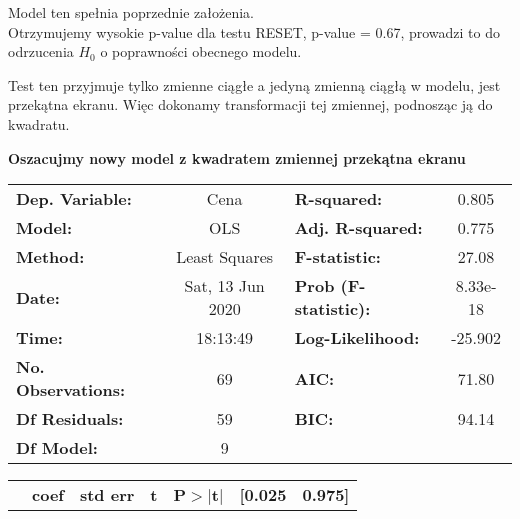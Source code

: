 \documentclass[11pt,a4paper]{article}
\begin{document}
		Model ten spełnia poprzednie założenia. \\
		
		Otrzymujemy wysokie p-value dla testu RESET, p-value = 0.67, prowadzi to do odrzucenia $H_0$ o poprawności obecnego modelu.
		
		Test ten przyjmuje tylko zmienne ciągłe a jedyną zmienną ciągłą w modelu, jest przekątna ekranu. 
		Więc dokonamy transformacji tej zmiennej, podnosząc ją do kwadratu.
		
		
			\textbf{Oszacujmy nowy model z kwadratem zmiennej przekątna ekranu }
			
			\begin{center}
				\begin{tabular}{lclc}
					 
					\textbf{Dep. Variable:}           &       Cena       & \textbf{  R-squared:         } &     0.805   \\
					\textbf{Model:}                   &       OLS        & \textbf{  Adj. R-squared:    } &     0.775   \\
					\textbf{Method:}                  &  Least Squares   & \textbf{  F-statistic:       } &     27.08   \\
					\textbf{Date:}                    & Sat, 13 Jun 2020 & \textbf{  Prob (F-statistic):} &  8.33e-18   \\
					\textbf{Time:}                    &     18:13:49     & \textbf{  Log-Likelihood:    } &   -25.902   \\
					\textbf{No. Observations:}        &          69      & \textbf{  AIC:               } &     71.80   \\
					\textbf{Df Residuals:}            &          59      & \textbf{  BIC:               } &     94.14   \\
					\textbf{Df Model:}                &           9      & \textbf{                     } &             \\
					 
				\end{tabular}
				\begin{tabular}{lcccccc}
					& \textbf{coef} & \textbf{std err} & \textbf{t} & \textbf{P$> |$t$|$} & \textbf{[0.025} & \textbf{0.975]}  \\
					 

\end{tabular}
\end{center}
\end{document}
